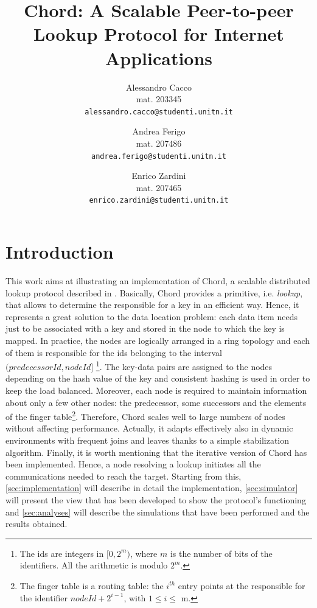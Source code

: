 \documentclass[11pt,twocolumn,letterpaper]{article}
\begin{document}
	
	\title{Chord: A Scalable Peer-to-peer Lookup Protocol for Internet Applications}
	
	\author{Alessandro Cacco\\
		mat. 203345\\
		{\tt\small alessandro.cacco@studenti.unitn.it}
		\and
		Andrea Ferigo\\
		mat. 207486\\
		{\tt\small andrea.ferigo@studenti.unitn.it}
		\and
		Enrico Zardini\\
		mat. 207465\\
		{\tt\small enrico.zardini@studenti.unitn.it}
	}
	\date{}
	\maketitle
	
	\section{Introduction}
	\label{sec:intro}
	This work aims at illustrating an implementation of Chord, a scalable distributed lookup protocol described in \cite{chord}. Basically, Chord provides a primitive, i.e. \textit{lookup}, that allows to determine the responsible for a key in an efficient way. Hence, it represents a great solution to the data location problem: each data item needs just to be associated with a key and stored in the node to which the key is mapped. \newline 
	In practice, the nodes are logically arranged in a ring topology and each of them is responsible for the ids belonging to the interval $(predecessorId, nodeId]$ \footnote{The ids are integers in $[0,2^m)$, where $m$ is the number of bits of the identifiers. All the arithmetic is modulo $2^m$.}. The key-data pairs are assigned to the nodes depending on the hash value of the key and consistent hashing is used in order to keep the load balanced. Moreover, each node is required to maintain information about only a few other nodes: the predecessor, some successors and the elements of the finger table\footnote{The finger table is a routing table: the $i^{th}$ entry points at the responsible for the identifier $nodeId+2^{i-1}$, with $1\leq i \leq$ m.\label{foot:ftable}}. Therefore, Chord scales well to large numbers of nodes without affecting performance. Actually, it adapts effectively also in dynamic environments with frequent joins and leaves thanks to a simple stabilization algorithm. \newline
	Finally, it is worth mentioning that the iterative version of Chord has been implemented. Hence, a node resolving a lookup initiates all the communications needed to reach the target. \newline
	Starting from this, \cref{sec:implementation} will describe in detail the implementation, \cref{sec:simulator} will present the view that has been developed to show the protocol's functioning and \cref{sec:analyses} will describe the simulations that have been performed and the results obtained. 
	
\end{document}
